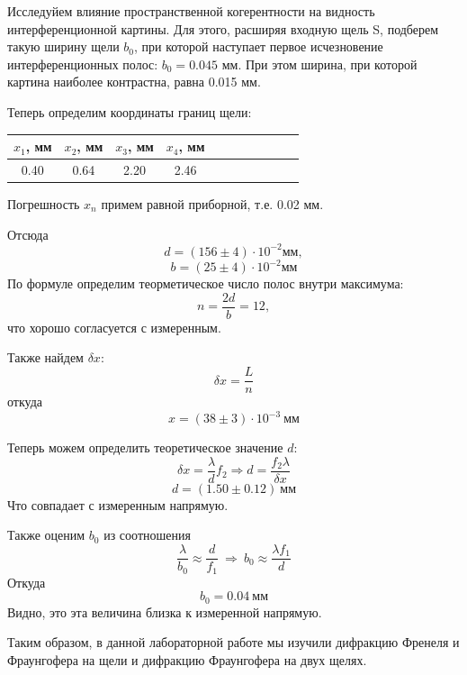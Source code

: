 \documentclass[14pt]{article}
\begin{document}
Исследуйем влияние пространственной когерентности на видность интерференционной картины. Для этого, расширяя входную щель S, подберем такую ширину щели $b_0$, при которой наступает первое исчезновение интерференционных полос: $b_0 = 0.045$ мм. При этом ширина, при которой картина наиболее контрастна, равна 0.015 мм.

Теперь определим координаты границ щели:
\begin{center}
\begin{tabular}{|c|c|c|c|c|c|c|c|c|c|c|}
\hline
$x_1$, мм	&	$x_2$, мм	&	$x_3$, мм	&	$x_4$, мм	\\
\hline
0.40		&	0.64		&	2.20		&	2.46		\\
\hline
\end{tabular}
\end{center}

Погрешность $x_n$ примем равной приборной, т.е. 0.02 мм.

Отсюда
$$
	d = (156 \pm 4)\cdot10^{-2}\text{мм},
$$
$$
	b = (25 \pm 4)\cdot10^{-2}\text{мм}
$$
По формуле определим теорметическое число полос внутри максимума:
$$
	n = \frac{2d}{b} = 12,
$$
что хорошо согласуется с измеренным.

Также найдем $\delta x$:
$$
	\delta x = \frac{L}{n}
$$
откуда
$$
	x = (38 \pm 3)\cdot10^{-3}~\text{мм}
$$

Теперь можем определить теоретическое значение $d$:
$$
	\delta x = \frac{\lambda}{d}f_2 \Rightarrow d = \frac{f_2\lambda}{\delta x}
$$
$$
	d = (1.50 \pm 0.12)~\text{мм}
$$
Что совпадает с измеренным напрямую.

Также оценим $b_0$ из соотношения
$$
	\frac{\lambda}{b_0} \approx \frac{d}{f_1}~\Rightarrow~ b_0 \approx \frac{\lambda f_1}{d}
$$
Откуда
$$
	b_0 = 0.04~\text{мм}
$$
Видно, это эта величина близка к измеренной напрямую. 

\newpage
Таким образом, в данной лабораторной работе мы изучили дифракцию Френеля и Фраунгофера на щели и дифракцию Фраунгофера на двух щелях. 
\end{document}
